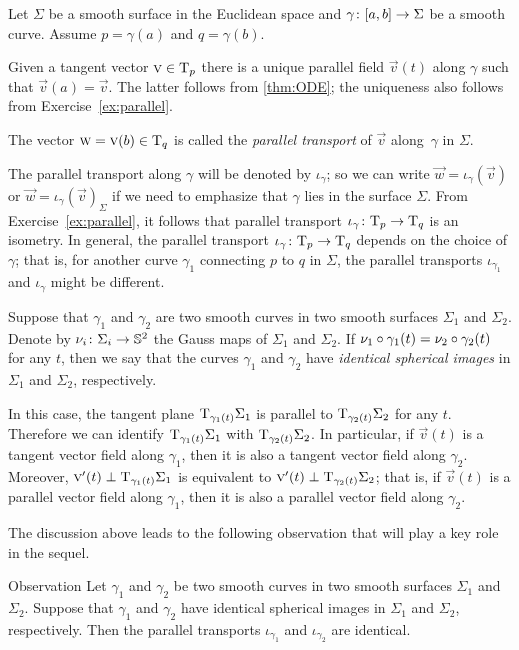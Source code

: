 Let $\Sigma$ be a smooth surface in the Euclidean space and $\gamma\:[a,b]\z\to \Sigma$ be a smooth curve.
Assume $p=\gamma(a)$ and $q=\gamma(b)$.

Given a tangent vector ${\text{\sc{v}}}\in\mathrm{T}_p$ there is a unique parallel field ${\vec v}(t)$ along $\gamma$ such that ${\vec v}(a)={\vec v}$.
The latter follows from \ref{thm:ODE}; the uniqueness also follows from Exercise~\ref{ex:parallel}.

The vector $\text{\sc{w}}={\text{\sc{v}}}(b)\in\mathrm{T}_q$ is called the \emph{parallel transport} of ${\vec v}$ along~$\gamma$ in $\Sigma$.

The parallel transport along $\gamma$ will be denoted by $\iota_\gamma$;
so we can write $\vec w=\iota_\gamma({\vec v})$ or  $\vec w=\iota_\gamma({\vec v})_\Sigma$ if we need to emphasize that $\gamma$ lies in the surface $\Sigma$.
From  Exercise~\ref{ex:parallel}, it follows that parallel transport $\iota_\gamma\:\T_p\z\to\T_q$ is an isometry.
In general, the parallel transport $\iota_\gamma\:\T_p\z\to\T_q$ depends on the choice of $\gamma$; that is, for another curve $\gamma_1$ connecting $p$ to $q$ in $\Sigma$, the parallel transports $\iota_{\gamma_1}$ and $\iota_{\gamma}$ might be different.

Suppose that $\gamma_1$ and $\gamma_2$ are two smooth curves in two smooth surfaces $\Sigma_1$ and $\Sigma_2$.
Denote by $\nu_i\colon\Sigma_i\to\mathbb{S}^2$ the Gauss maps of $\Sigma_1$ and $\Sigma_2$.
If $\nu_1\circ\gamma_1(t)= \nu_2\circ\gamma_2(t)$ for any $t$, then we say that the curves $\gamma_1$ and $\gamma_2$ have {}\emph{identical spherical images} in $\Sigma_1$ and $\Sigma_2$, respectively.

In this case, the tangent plane $\mathrm{T}_{\gamma_1(t)}\Sigma_1$ is parallel to $\mathrm{T}_{\gamma_2(t)}\Sigma_2$ for any $t$.
Therefore we can identify $\mathrm{T}_{\gamma_1(t)}\Sigma_1$ with $\mathrm{T}_{\gamma_2(t)}\Sigma_2$.
In particular, if $\vec v(t)$ is a tangent vector field along $\gamma_1$,
then it is also a tangent vector field along $\gamma_2$.
Moreover, $\text{\sc{v}}'(t)\perp \mathrm{T}_{\gamma_1(t)}\Sigma_1$ is equivalent to $\text{\sc{v}}'(t)\perp \mathrm{T}_{\gamma_2(t)}\Sigma_2$; that is, if $\vec v(t)$ is a parallel vector field along $\gamma_1$,
then it is also a parallel vector field along $\gamma_2$.

The discussion above leads to the following observation that will play a key role in the sequel.

\begin{thm}{Observation}\label{obs:parallel=}
Let $\gamma_1$ and $\gamma_2$ be two smooth curves in two smooth surfaces $\Sigma_1$ and $\Sigma_2$.
Suppose that $\gamma_1$ and $\gamma_2$ have identical spherical images in $\Sigma_1$ and $\Sigma_2$, respectively.
Then the parallel transports $\iota_{\gamma_1}$ and $\iota_{\gamma_2}$ are identical. 
\end{thm}

